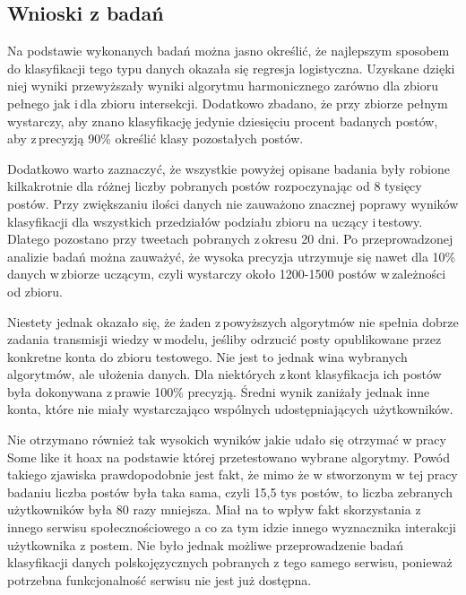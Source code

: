 \subsection{Wnioski z badań}
Na podstawie wykonanych badań można jasno określić, że najlepszym sposobem do klasyfikacji tego typu danych okazała się regresja logistyczna. Uzyskane dzięki niej wyniki przewyższały wyniki algorytmu harmonicznego zarówno dla zbioru pełnego jak i\,dla zbioru intersekcji. Dodatkowo zbadano, że przy zbiorze pełnym wystarczy, aby znano klasyfikację jedynie dziesięciu procent badanych postów, aby z\,precyzją 90\% określić klasy pozostałych postów. 
\par
Dodatkowo warto zaznaczyć, że wszystkie powyżej opisane badania były robione kilkakrotnie dla różnej liczby pobranych postów rozpoczynając od 8 tysięcy postów. Przy zwiększaniu ilości danych nie zauważono znacznej poprawy wyników klasyfikacji dla wszystkich przedziałów podziału zbioru na uczący i\,testowy. Dlatego pozostano przy tweetach pobranych z\,okresu 20 dni. Po przeprowadzonej analizie badań można zauważyć, że wysoka precyzja utrzymuje się nawet dla 10\% danych w\,zbiorze uczącym, czyli wystarczy około 1200-1500 postów w\,zależności od zbioru.
\par
Niestety jednak okazało się, że żaden z\,powyższych algorytmów nie spełnia dobrze zadania transmisji wiedzy w\,modelu, jeśliby odrzucić posty opublikowane przez konkretne konta do zbioru testowego. Nie jest to jednak wina wybranych algorytmów, ale ułożenia danych. Dla niektórych z\,kont klasyfikacja ich postów była dokonywana z\,prawie 100\% precyzją. Średni wynik zaniżały jednak inne konta, które nie miały wystarczająco wspólnych udostępniających użytkowników. 
\par 
Nie otrzymano również tak wysokich wyników jakie udało się otrzymać w pracy Some like it hoax na podstawie której przetestowano wybrane algorytmy. Powód takiego zjawiska prawdopodobnie jest fakt, że mimo że w stworzonym w tej pracy badaniu liczba postów była taka sama, czyli 15,5 tys postów, to liczba zebranych użytkowników była 80 razy mniejsza. Miał na to wpływ fakt skorzystania z innego serwisu społecznościowego a co za tym idzie innego wyznacznika interakcji użytkownika z postem. Nie było jednak możliwe przeprowadzenie badań klasyfikacji danych polskojęzycznych pobranych z tego samego serwisu, ponieważ potrzebna funkcjonalność serwisu nie jest już dostępna. 